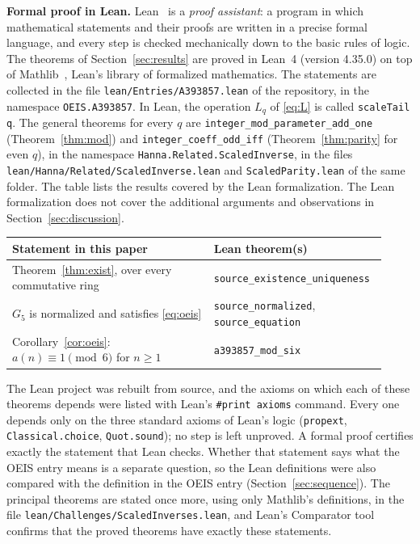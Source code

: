 \documentclass[11pt,a4paper]{article}
\theoremstyle{definition}
\theoremstyle{remark}
\newcommand{\para}[1]{\par\medskip\noindent\textbf{#1}\enspace}
\begin{document}
\para{Formal proof in Lean.}
Lean~\cite{lean} is a \emph{proof assistant}: a program in which mathematical statements and their proofs are written
in a precise formal language, and every step is checked mechanically down to the basic rules of logic. The theorems of Section~\ref{sec:results} are proved in Lean~4 (version 4.35.0) on top of
Mathlib~\cite{mathlib}, Lean's library of formalized mathematics. The statements are collected in the file \texttt{lean/Entries/A393857.lean} of the repository,
in the namespace \texttt{OEIS.A393857}. In Lean, the operation $L_q$ of \eqref{eq:L} is called \texttt{scaleTail q}. The general theorems for every $q$ are \texttt{integer\_mod\_parameter\_add\_one} (Theorem~\ref{thm:mod}) and \texttt{integer\_coeff\_odd\_iff} (Theorem~\ref{thm:parity} for even $q$), in the namespace \texttt{Hanna.\allowbreak Related.\allowbreak ScaledInverse}, in the files \texttt{lean/\allowbreak Hanna/\allowbreak Related/\allowbreak ScaledInverse.lean} and \texttt{ScaledParity.lean} of the same folder.
The table lists the results covered by the Lean formalization. The Lean formalization does not cover the additional arguments and observations in Section~\ref{sec:discussion}.
\begin{center}\small\renewcommand{\arraystretch}{1.25}
\begin{tabular}{>{\raggedright\arraybackslash}p{0.52\linewidth}>{\raggedright\arraybackslash}p{0.4\linewidth}}
\toprule
Statement in this paper & Lean theorem(s)\\
\midrule
Theorem~\ref{thm:exist}, over every commutative ring & \texttt{source\_\allowbreak{}existence\_\allowbreak{}uniqueness} \\
$G_{5}$ is normalized and satisfies \eqref{eq:oeis} & \texttt{source\_\allowbreak{}normalized}, \texttt{source\_\allowbreak{}equation} \\
Corollary~\ref{cor:oeis}: $a(n)\equiv1\pmod{6}$ for $n\ge1$ & \texttt{a393857\_\allowbreak{}mod\_\allowbreak{}six} \\
\bottomrule
\end{tabular}
\end{center}
The Lean project was rebuilt from source, and the axioms on which each of these theorems depends were listed with
Lean's \texttt{\#print axioms} command. Every one depends only on the three standard axioms of Lean's logic
(\texttt{propext}, \texttt{Classical.choice}, \texttt{Quot.sound}); no step is left unproved. A formal proof certifies
exactly the statement that Lean checks. Whether that statement says what the OEIS entry means is a separate question,
so the Lean definitions were also compared with the definition in the OEIS entry
(Section~\ref{sec:sequence}). The principal theorems are stated once more, using only Mathlib's definitions, in the
file \texttt{lean/Challenges/ScaledInverses.lean}, and Lean's Comparator tool confirms that the
proved theorems have exactly these statements.
\end{document}
